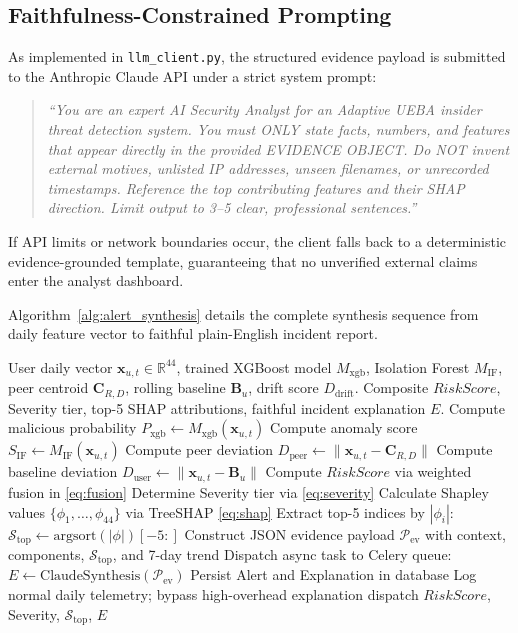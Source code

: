 \documentclass[conference]{IEEEtran}
\begin{document}
\subsection{Faithfulness-Constrained Prompting}
As implemented in \texttt{llm\_client.py}, the structured evidence payload is submitted to the Anthropic Claude API under a strict system prompt:
\begin{quote}
\textit{``You are an expert AI Security Analyst for an Adaptive UEBA insider threat detection system. You must ONLY state facts, numbers, and features that appear directly in the provided EVIDENCE OBJECT. Do NOT invent external motives, unlisted IP addresses, unseen filenames, or unrecorded timestamps. Reference the top contributing features and their SHAP direction. Limit output to 3--5 clear, professional sentences.''}
\end{quote}

If API limits or network boundaries occur, the client falls back to a deterministic evidence-grounded template, guaranteeing that no unverified external claims enter the analyst dashboard.

Algorithm~\ref{alg:alert_synthesis} details the complete synthesis sequence from daily feature vector to faithful plain-English incident report.

\begin{algorithm}[t]
\caption{Hybrid Risk Fusion and Evidence-Grounded Alert Synthesis}
\label{alg:alert_synthesis}
\begin{algorithmic}[1]
\REQUIRE User daily vector $\mathbf{x}_{u,t} \in \mathbb{R}^{44}$, trained XGBoost model $M_{\text{xgb}}$, Isolation Forest $M_{\text{IF}}$, peer centroid $\mathbf{C}_{R,D}$, rolling baseline $\mathbf{B}_u$, drift score $D_{\text{drift}}$.
\ENSURE Composite $RiskScore$, Severity tier, top-5 SHAP attributions, faithful incident explanation $E$.
\STATE Compute malicious probability $P_{\text{xgb}} \leftarrow M_{\text{xgb}}(\mathbf{x}_{u,t})$
\STATE Compute anomaly score $S_{\text{IF}} \leftarrow M_{\text{IF}}(\mathbf{x}_{u,t})$
\STATE Compute peer deviation $D_{\text{peer}} \leftarrow \|\mathbf{x}_{u,t} - \mathbf{C}_{R,D}\|$
\STATE Compute baseline deviation $D_{\text{user}} \leftarrow \|\mathbf{x}_{u,t} - \mathbf{B}_u\|$
\STATE Compute $RiskScore$ via weighted fusion in \eqref{eq:fusion}
\STATE Determine Severity tier via \eqref{eq:severity}
    \STATE Calculate Shapley values $\{\phi_1, \dots, \phi_{44}\}$ via TreeSHAP \eqref{eq:shap}
    \STATE Extract top-5 indices by $|\phi_i|$: $\mathcal{S}_{\text{top}} \leftarrow \text{argsort}(|\phi|)[-5:]$
    \STATE Construct JSON evidence payload $\mathcal{P}_{\text{ev}}$ with context, components, $\mathcal{S}_{\text{top}}$, and 7-day trend
    \STATE Dispatch async task to Celery queue: $E \leftarrow \text{ClaudeSynthesis}(\mathcal{P}_{\text{ev}})$
    \STATE Persist Alert and Explanation in database
\ELSE
    \STATE Log normal daily telemetry; bypass high-overhead explanation dispatch
\ENDIF
\RETURN $RiskScore$, Severity, $\mathcal{S}_{\text{top}}$, $E$
\end{algorithmic}
\end{algorithm}
\end{document}
